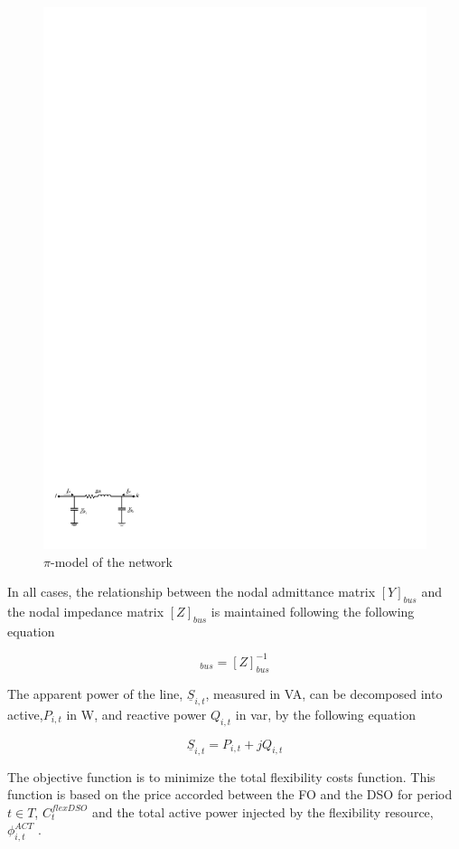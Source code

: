 \begin{figure}[]
	\centering
	\includegraphics[width=0.7\columnwidth ]{ChapterOPF_DSO/Figures/pimodel2.pdf}
		\caption{$\pi$-model of the network}
	\label{fig:pimodel}  
\end{figure}

In all cases, the relationship between the nodal admittance matrix  $[Y]_{bus}$ and the nodal impedance matrix  $[Z]_{bus}$ is maintained following the following equation 

\begin{equation}
[Y]_{bus} = [Z]_{bus}^{-1}
\end{equation}


The apparent power of the line, $\underline{S}_{i,t}$, measured in VA, can be decomposed into active,$P_{i,t}$ in W, and reactive power $Q_{i,t}$ in var, by the following equation 

\begin{equation}
\underline{S}_{i,t} = P_{i,t} + jQ_{i,t}
\end{equation}


The objective function is to minimize the total flexibility costs function. This function is based on the price accorded between the FO and the DSO for period $t \in T$, $C_{t}^{flexDSO}$ and the total active power injected by the flexibility resource, $\phi_{i,t}^{ACT}$ .


